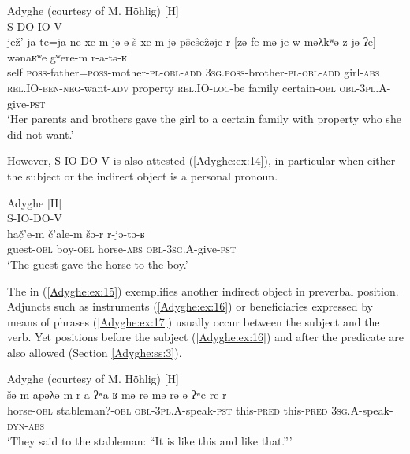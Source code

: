 \documentclass[output=paper,colorlinks,citecolor=brown, draft]{langscibook}
\begin{document}
\ea\label{Adyghe:ex:13} 
Adyghe (courtesy of M. Höhlig) [H] \\
\textcolor{C1}{S}-\textcolor{C2}{DO}-\textcolor{C5}{IO}-\textcolor{C4}{V} \\
\gll \textcolor{C1}{jež'} \textcolor{C1}{ja-te=ja-ne-xe-m-jə} \textcolor{C1}{ə-š-xe-m-jə} \textcolor{C2}{pŝeŝeẑəje-r} [\textcolor{C5}{zə-fe-mə-je-w} \textcolor{C5}{məλkʷə} \textcolor{C5}{z-jə-ʔe}] \textcolor{C5}{wənaʁʷe} \textcolor{C5}{gʷere-m} \textcolor{C4}{r-a-tə-ʁ} \\
self \textsc{poss-}father\textsc{=poss-}mother\textsc{-pl-obl-add} \textsc{3sg.poss-}brother\textsc{-pl-obl-add} girl\textsc{-abs} \textsc{rel.IO-}\textsc{ben}\textsc{-neg-}want\textsc{-adv} property \textsc{rel.IO-loc-}be family certain\textsc{-obl} \textsc{obl-3pl.A-}give\textsc{-pst} \\
\glt `Her parents and brothers gave the girl to a certain family with property who she did not want.'
\z

However, S-IO-DO-V is also attested (\ref{Adyghe:ex:14}), in particular when either the subject or the indirect object is a personal pronoun. 

\ea\label{Adyghe:ex:14} 
Adyghe \citep[65]{rogava1966grammatika} [H] \\
\textcolor{C1}{S}-\textcolor{C5}{IO}-\textcolor{C2}{DO}-\textcolor{C4}{V} \\
\gll \textcolor{C1}{hač̣'e-m} \textcolor{C5}{č̣'ale-m} \textcolor{C2}{šə-r} \textcolor{C4}{r-jə-tə-ʁ} \\
guest\textsc{-obl} boy\textsc{-obl} horse\textsc{-abs} \textsc{obl-3sg.A-}give\textsc{-pst} \\ 
\glt `The guest gave the horse to the boy.'
\z

The  in (\ref{Adyghe:ex:15}) exemplifies another indirect object in preverbal position. Adjuncts such as instruments (\ref{Adyghe:ex:16}) or beneficiaries expressed by means of  phrases (\ref{Adyghe:ex:17}) usually occur between the subject and the verb. Yet positions before the subject (\ref{Adyghe:ex:16}) and after the predicate are also allowed (Section \ref{Adyghe:ss:3}).

\ea\label{Adyghe:ex:15}
Adyghe (courtesy of M. Höhlig) [H] \\
\gll šə-m apəλə-m r-a-ʔʷa-ʁ mə-rə mə-rə  ə-ʔʷe-re-r \\
horse\textsc{-obl} stableman?\textsc{-obl} \textsc{obl-3pl.A-}speak\textsc{-pst} this\textsc{-pred} this\textsc{-pred} \textsc{3sg.A-}speak\textsc{-dyn-abs} \\
\glt `They said to the stableman: ``It is like this and like that.''' 
\z
\end{document}
